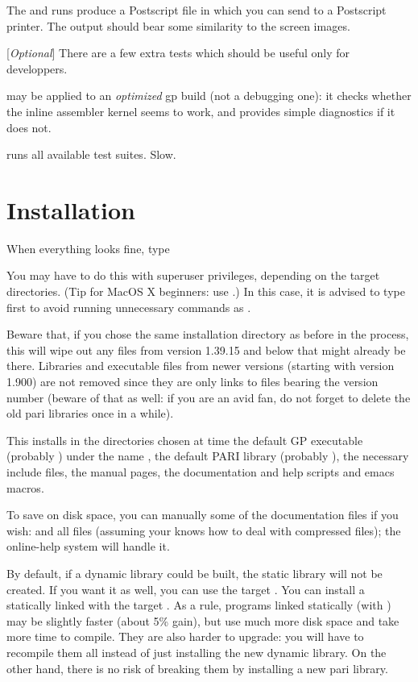 The  and  runs produce a Postscript
file  in  which you can send to a Postscript
printer. The output should bear some similarity to the screen images.

 [{\sl Optional\/}]
There are a few extra tests which should be useful only for developpers.

 may be applied to an \emph{optimized} gp build (not a
debugging one): it checks whether the inline assembler kernel seems to work,
and provides simple diagnostics if it does not.

 runs all available test suites. Slow.

\section{Installation} When everything looks fine, type


\noindent You may have to do this with superuser privileges, depending on the
target directories. (Tip for MacOS X beginners: use .)
In this case, it is advised to type  first to avoid running
unnecessary commands as .

Beware that, if you chose the same installation directory as before in the
 process, this will wipe out any files from version 1.39.15
and below that might already be there. Libraries and executable files from
newer versions (starting with version 1.900) are not removed since they are
only links to files bearing the version number (beware of that as well: if
you are an avid  fan, do not forget to delete the old pari libraries
once in a while).

This installs in the directories chosen at  time the default
GP executable (probably ) under the name , the default
PARI library (probably ), the necessary include files, the
manual pages, the documentation and help scripts and emacs macros.

To save on disk space, you can manually  some of the documentation
files if you wish:  and all  files (assuming your
 knows how to deal with compressed files); the online-help system
will handle it.

By default, if a dynamic library  could be built, the static
library  will not be created. If you want it as well, you can
use the target . You can install a statically
linked  with the target . As a rule,
programs linked statically (with ) may be slightly faster
(about 5\% gain), but use much more disk space and take more time to compile.
They are also harder to upgrade: you will have to recompile them all instead
of just installing the new dynamic library. On the other hand, there is no
risk of breaking them by installing a new pari library.

